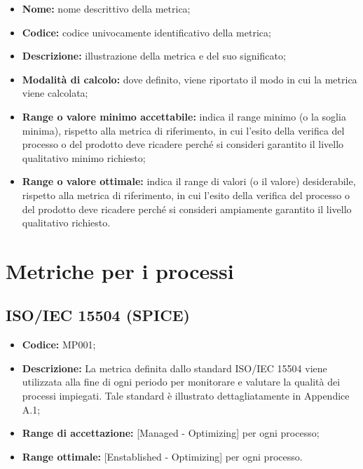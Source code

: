 \documentclass[openany,12pt,a4paper]{report}
\begin{document}
\begin{itemize}
    \item \textbf{Nome:} nome descrittivo della metrica;
    
    \item \textbf{Codice:} codice univocamente identificativo della metrica;
    
    \item \textbf{Descrizione:} illustrazione della metrica e del suo significato; 
    
    \item \textbf{Modalità di calcolo:} dove definito, viene riportato il modo in cui la metrica viene calcolata;
    
    \item \textbf{Range o valore minimo accettabile:} indica il range minimo (o la soglia minima), rispetto alla metrica di riferimento, in cui l'esito della verifica del processo o del prodotto deve ricadere perché si consideri garantito il livello qualitativo minimo richiesto;

    \item \textbf{Range o valore ottimale:} indica il range di valori (o il valore) desiderabile, rispetto alla metrica di riferimento, in cui l'esito della verifica del processo o del prodotto deve ricadere perché si consideri ampiamente garantito il livello qualitativo richiesto.
\end{itemize}


\section{Metriche per i processi}

\subsection{ISO/IEC 15504 (SPICE)}

\begin{itemize}
    \item \textbf{Codice:} MP001;
    \item \textbf{Descrizione:} La metrica definita dallo standard ISO/IEC 15504 viene utilizzata alla fine di ogni periodo per monitorare e valutare la qualità dei processi impiegati. Tale standard è illustrato dettagliatamente in Appendice A.1;
    \item \textbf{Range di accettazione:} [Managed - Optimizing] per ogni processo;
    \item \textbf{Range ottimale:} [Enstablished - Optimizing] per ogni processo.
\end{itemize}
\end{document}
